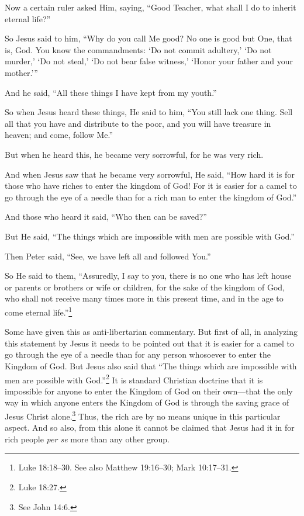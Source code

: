 \documentclass[letterpaper,12pt]{article}
\newenvironment{squotation}
  {\small\quotation}
  {\endquotation\normalsize}
\begin{document}
\begin{squotation}
Now a certain ruler asked Him, saying, ``Good Teacher, what shall I do to inherit eternal life?''

So Jesus said to him, ``Why do you call Me good? No one is good but One, that is, God. You know the commandments: `Do not commit adultery,' `Do not murder,' `Do not steal,' `Do not bear false witness,' `Honor your father and your mother.'\thinspace''

And he said, ``All these things I have kept from my youth.''

So when Jesus heard these things, He said to him, ``You still lack one thing. Sell all that you have and distribute to the poor, and you will have treasure in heaven; and come, follow Me.''

But when he heard this, he became very sorrowful, for he was very rich.

And when Jesus saw that he became very sorrowful, He said, ``How hard it is for those who have riches to enter the kingdom of God! For it is easier for a camel to go through the eye of a needle than for a rich man to enter the kingdom of God.''

And those who heard it said, ``Who then can be saved?''

But He said, ``The things which are impossible with men are possible with God.''

Then Peter said, ``See, we have left all and followed You.''

So He said to them, ``Assuredly, I say to you, there is no one who has left house or parents or brothers or wife or children, for the sake of the kingdom of God, who shall not receive many times more in this present time, and in the age to come eternal life.''\footnote{Luke 18:18--30. See also Matthew 19:16--30; Mark 10:17--31.}
\end{squotation}

Some have given this as anti-libertarian commentary. But first of all, in analyzing this statement by Jesus it needs to be pointed out that it is easier for a camel to go through the eye of a needle than for any person whosoever to enter the Kingdom of God. But Jesus also said that ``The things which are impossible with men are possible with God.''\footnote{Luke 18:27.} It is standard Christian doctrine that it is impossible for anyone to enter the Kingdom of God on their own---that the only way in which anyone enters the Kingdom of God is through the saving grace of Jesus Christ alone.\footnote{See John 14:6.} Thus, the rich are by no means unique in this particular aspect. And so also, from this alone it cannot be claimed that Jesus had it in for rich people \emph{per se} more than any other group.
\end{document}

